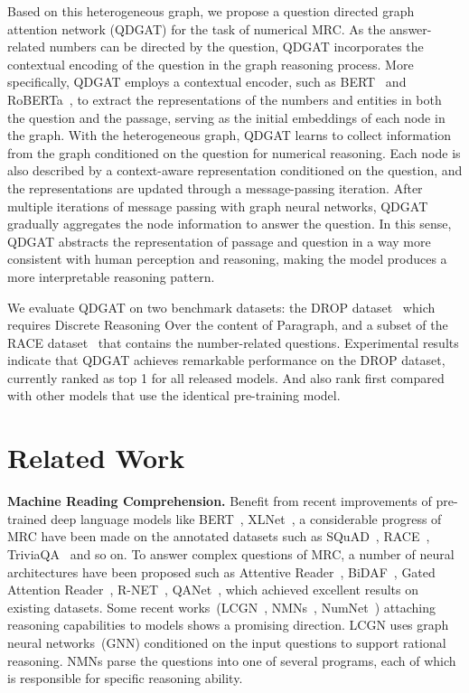 \documentclass{article}
\begin{document}
Based on this heterogeneous graph, we propose a question directed graph attention network (QDGAT) for the task of numerical MRC.
As the answer-related numbers can be directed by the question, QDGAT incorporates the contextual encoding of the question in the graph reasoning process.
More specifically, QDGAT employs a contextual encoder, such as BERT~\cite{devlin-etal-2019-bert} and RoBERTa~\cite{DBLP:journals/corr/abs-1907-11692}, to extract the representations of the numbers and entities in both the question and the passage, serving as the initial embeddings of each node in the graph.
With the heterogeneous graph, QDGAT learns to collect information from the graph conditioned on the question for numerical reasoning.
Each node is also described by a context-aware representation conditioned on the question, and the representations are updated through a message-passing iteration.
After multiple iterations of message passing with graph neural networks, QDGAT gradually aggregates the node information to answer the question.
In this sense, QDGAT abstracts the representation of passage and question in a way more consistent with human perception and reasoning, making the model produces a more interpretable reasoning pattern.


We evaluate QDGAT on two benchmark datasets: the DROP dataset~\cite{DBLP:conf/naacl/DuaWDSS019} which requires Discrete Reasoning Over the content of Paragraph, and a subset of the RACE dataset~\cite{lai-etal-2017-race} that contains the number-related questions.
Experimental results indicate that QDGAT achieves remarkable performance on the DROP dataset, currently ranked as top 1 for all released models. And also rank first compared with other models that use the identical pre-training model.









\section{Related Work}

{\bf Machine Reading Comprehension.}
Benefit from recent improvements of pre-trained deep language models like BERT~\cite{devlin-etal-2019-bert}, XLNet~\cite{yang2019xlnet}, a considerable progress of MRC have been made on the annotated datasets such as SQuAD~\cite{rajpurkar-etal-2016-squad}, RACE~\cite{lai-etal-2017-race}, TriviaQA~\cite{JoshiTriviaQA2017} and so on. 
To answer complex questions of MRC, a number of neural architectures have been proposed such as Attentive Reader~\cite{hermann2015teaching}, BiDAF~\cite{Seo2017Bidirectional}, Gated Attention Reader~\cite{dhingra-etal-2017-gated}, R-NET~\cite{wang2017rnet}, QANet~\cite{wei2018qanet}, which achieved excellent results on existing datasets.
Some recent works~(LCGN~\cite{hu2019lcgn}, NMNs~\cite{gupta2020nms}, NumNet~\cite{DBLP:conf/emnlp/RanLLZL19}) attaching reasoning capabilities to models shows a promising direction. LCGN uses graph neural networks~(GNN) conditioned on the input questions to support rational reasoning. NMNs parse the questions into one of several programs, each of which is responsible for specific reasoning ability.
\end{document}
